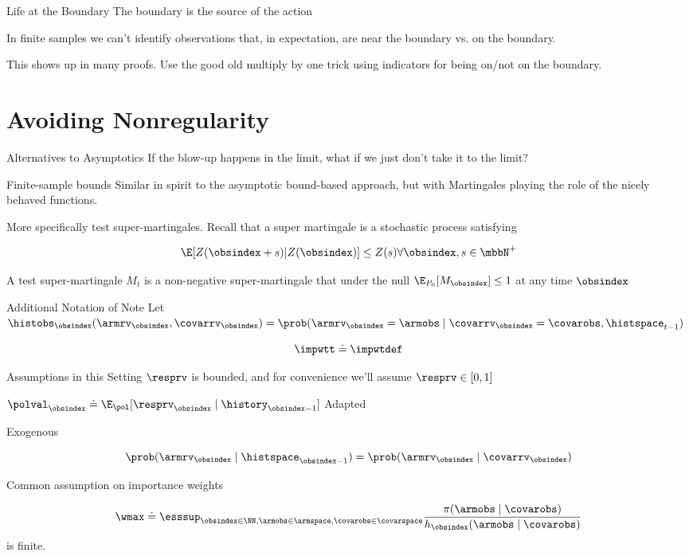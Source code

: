 \documentclass[aspectratio=169, professionalfonts]{beamer}
\begin{document}
\begin{frame}{Life at the Boundary}
	The boundary is the source of the action

	In finite samples we can't identify observations that, in expectation, are
	near the boundary vs. on the boundary.

	This shows up in many proofs. Use the good old multiply by one trick using
	indicators for being on/not on the boundary.

\end{frame}

\section{Avoiding Nonregularity}
\begin{frame}{Alternatives to Asymptotics}
	If the blow-up happens in the limit, what if we just don't take it to the limit?
\end{frame}

\begin{frame}{Finite-sample bounds}
	Similar in spirit to the asymptotic bound-based approach, but with Martingales
	playing the role of the nicely behaved functions.

	More specifically test super-martingales. Recall that a super martingale is
	a stochastic process satisfying

	$$\E[Z(\obsindex + s) | Z(\obsindex)] \leq Z(s) \forall \obsindex, s \in \mbbN^+$$

	A test super-martingale $M_t$ is a non-negative super-martingale that under
	the null $\E_{P_0}[M_\obsindex] \leq 1$ at any time $\obsindex$
\end{frame}

\begin{frame}{Additional Notation of Note}
	Let $\histobs_{\obsindex}(\armrv_{\obsindex}, \covarrv_{\obsindex}) =
		\prob(\armrv_{\obsindex} = \armobs \mid \covarrv_{\obsindex} = \covarobs, \histspace_{t-1})$

	\[\impwtt \doteq \impwtdef \]
\end{frame}

\begin{frame}{Assumptions in this Setting}
	$\resprv$ is bounded, and for convenience we'll assume $\resprv \in [0,1]$

	$\polval_{\obsindex} \doteq \E_{\pol} [\resprv_{\obsindex} \mid \history_{\obsindex-1}]$
	Adapted

	Exogenous

	$$\prob(\armrv_{\obsindex} \mid \histspace_{\obsindex - 1}) =
		\prob(\armrv_{\obsindex} \mid \covarrv_{\obsindex})$$

	Common assumption on importance weights

	\[\wmax \doteq \esssup_{\obsindex \in \NN, \armobs \in \armspace, \covarobs \in
			\covarspace} \frac{\pi(\armobs \mid \covarobs)}{h_{\obsindex}(\armobs \mid
			\covarobs)} \] is finite.
\end{frame}
\end{document}

